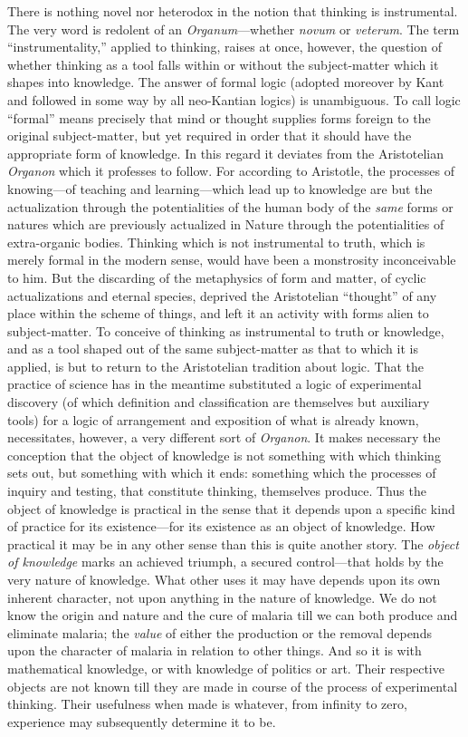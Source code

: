 \documentclass[12pt]{article}
\begin{document}
There is nothing novel nor heterodox in the notion
that thinking is instrumental. The very word is
redolent of an \emph{Organum}---whether \emph{novum} or \emph{veterum}.
The term ``instrumentality,'' applied to thinking,
raises at once, however, the question of whether
thinking as a tool falls within or without the subject-matter
which it shapes into knowledge. The answer of
formal logic (adopted moreover by Kant and followed
in some way by all neo-Kantian logics) is unambiguous.
To call logic ``formal'' means precisely that
mind or thought supplies forms foreign to the original
subject-matter, but yet required in order that it
should have the appropriate form of knowledge. In
this regard it deviates from the Aristotelian \emph{Organon}
which it professes to follow. For according to
Aristotle, the processes of knowing---of teaching and
learning---which lead up to knowledge are but the
actualization through the potentialities of the human
body of the \emph{same} forms or natures which are previously
actualized in Nature through the potentialities
of extra-organic bodies. Thinking which is not
instrumental to truth, which is merely formal in the
modern sense, would have been a monstrosity inconceivable
to him. But the discarding of the metaphysics
of form and matter, of cyclic actualizations and
eternal species, deprived the Aristotelian ``thought''
of any place within the scheme of things, and left it
an activity with forms alien to subject-matter. To
conceive of thinking as instrumental to truth or
knowledge, and as a tool shaped out of the same
subject-matter as that to which it is applied, is but
to return to the Aristotelian tradition about logic.
That the practice of science has in the meantime
substituted a logic of experimental discovery (of
which definition and classification are themselves but
auxiliary tools) for a logic of arrangement and exposition
of what is already known, necessitates, however,
a very different sort of \emph{Organon}. It makes
necessary the conception that the object of knowledge
is not something with which thinking sets out,
but something with which it ends: something which
the processes of inquiry and testing, that constitute
thinking, themselves produce. Thus the object of
knowledge is practical in the sense that it depends
upon a specific kind of practice for its existence---for its
existence as an object of knowledge. How practical
it may be in any other sense than this is quite another
story. The \emph{object of knowledge} marks an achieved
triumph, a secured control---that holds by the very
nature of knowledge. What other uses it may have
depends upon its own inherent character, not upon
anything in the nature of knowledge. We do not
know the origin and nature and the cure of malaria
till we can both produce and eliminate
malaria; the \emph{value} of either the production or the
removal depends upon the character of malaria in
relation to other things. And so it is with mathematical
knowledge, or with knowledge of politics or
art. Their respective objects are not known till they
are made in course of the process of experimental
thinking. Their usefulness when made is whatever,
from infinity to zero, experience may subsequently
determine it to be.
\end{document}

